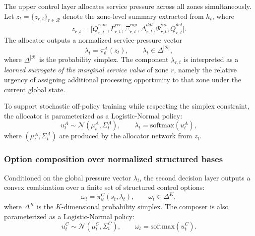 \documentclass[a4paper,fleqn]{cas-sc}
\begin{document}
The upper control layer allocates service pressure across all zones simultaneously. Let $z_t=\{z_{r,t}\}_{r\in\mathcal{R}}$ denote the zone-level summary extracted from $h_t$, where
\begin{equation}
z_{r,t}=
\big[
\bar Q_{r,t}^{rem},
\bar \Gamma_{r,t}^{rec},
\bar \Xi_{r,t}^{cap},
\bar \Delta_{r,t}^{ddl},
\bar \Psi_{r,t}^{int},
\bar Q_{r,t}^{del}
\big].
\label{eq:zone_summary}
\end{equation}
The allocator outputs a normalized service-pressure vector
\begin{equation}
\lambda_t=\pi_{\theta}^{A}(z_t), \qquad \lambda_t\in\Delta^{|\mathcal{R}|},
\label{eq:lambda_alloc}
\end{equation}
where $\Delta^{|\mathcal{R}|}$ is the probability simplex. The component $\lambda_{r,t}$ is interpreted as a \emph{learned surrogate of the marginal service value} of zone $r$, namely the relative urgency of assigning additional processing opportunity to that zone under the current global state.

To support stochastic off-policy training while respecting the simplex constraint, the allocator is parameterized as a Logistic-Normal policy:
\begin{equation}
u_t^{A}\sim \mathcal{N}(\mu_t^{A},\Sigma_t^{A}), \qquad
\lambda_t=\mathrm{softmax}(u_t^{A}),
\label{eq:lambda_logistic_normal}
\end{equation}
where $(\mu_t^{A},\Sigma_t^{A})$ are produced by the allocator network from $z_t$.

\subsubsection{Option composition over normalized structured bases}

Conditioned on the global pressure vector $\lambda_t$, the second decision layer outputs a convex combination over a finite set of structured control options:
\begin{equation}
\omega_t=\pi_{\psi}^{C}(s_t,\lambda_t), \qquad \omega_t\in\Delta^{K},
\label{eq:omega_comp}
\end{equation}
where $\Delta^K$ is the $K$-dimensional probability simplex. The composer is also parameterized as a Logistic-Normal policy:
\begin{equation}
u_t^{C}\sim \mathcal{N}(\mu_t^{C},\Sigma_t^{C}), \qquad
\omega_t=\mathrm{softmax}(u_t^{C}).
\label{eq:omega_logistic_normal}
\end{equation}
\end{document}
